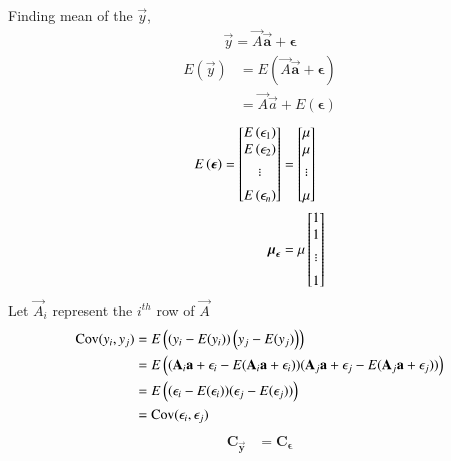 \documentclass[journal,12pt,onecolumn]{IEEEtran}
\providecommand{\mtx}[1]{\mathbf{#1}}
\theoremstyle{remark}
\begin{document}
Finding mean of the ${\vec{y}}$,
\begin{align}
\vec{y}=\vec{A}\mtx{\vec{a}}+\boldsymbol{\epsilon}
\end{align}
\begin{align}
E(\vec{y})&=E(\vec{A}\mtx{\vec{a}}+\boldsymbol{\epsilon})\\
&=\vec{A}\vec{a}+E(\boldsymbol{\epsilon})
\end{align}
\begin{align}
E\brak{\boldsymbol{{\epsilon}}} = \begin{bmatrix}
E\brak{{\epsilon}_1} \\%
E\brak{{\epsilon}_2} \\%
. \\[-10pt]
. \\[-10pt]
. \\[5pt]
E\brak{{\epsilon}_n}
\end{bmatrix}&=\begin{bmatrix}
\mu \\%
\mu \\%
. \\[-10pt]
. \\[-10pt]
. \\[5pt]
\mu
\end{bmatrix}\\
\vec{\boldsymbol{\mu}}_{\boldsymbol{{\epsilon}}}&=\mu \begin{bmatrix}
1 \\%
1 \\%
. \\[-10pt]
. \\[-10pt]
. \\[5pt]
1
\end{bmatrix}
\end{align}
Let $\vec{A}_i $ represent the $i^{th}$ row of $\vec{A}$
\begin{align}
\textrm{Cov}({y}_i,{y}_j)&=E\left(\left({y}_i-E(y_i)\right)\left({y}_j-E(y_j)\right)\right)\\
&=E\left(({\mathbf{A}}_i\mathbf{a}+{\epsilon}_i-E({\mathbf{A}}_i\mathbf{a}+{\epsilon}_i))({\mathbf{A}}_j\mathbf{a}+{\epsilon}_j-E({\mathbf{A}}_j\mathbf{a}+{\epsilon}_j))\right)\\
&=E\left(({\epsilon}_i-E({\epsilon}_i))({\epsilon}_j-E({\epsilon}_j))\right)\\
&=\textrm{Cov}({\epsilon}_i,{\epsilon}_j)
\end{align}
\begin{align}
 \mathbf{C_{\vec{y}}}&=\mathbf{C_{\boldsymbol{\epsilon}}}
 \end{align}
\end{document}
